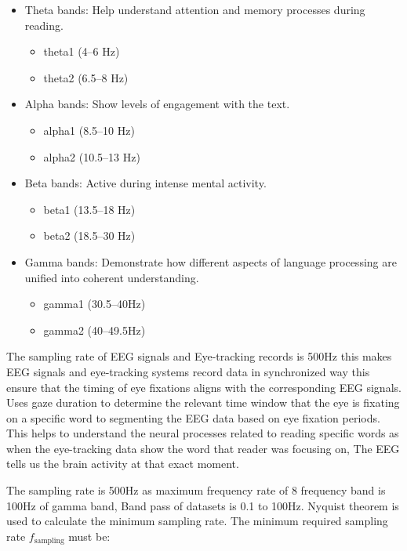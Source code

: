 \documentclass[journal]{IEEEtran}
\begin{document}
\begin{itemize}
	\item Theta bands: Help understand attention and memory processes during reading.
	      \begin{itemize}
	      	\item theta1 (4–6 Hz)
	      	\item theta2 (6.5–8 Hz)
	      \end{itemize}
	\item Alpha bands: Show levels of engagement with the text.
	      \begin{itemize}
	      	\item alpha1 (8.5–10 Hz)
	      	\item alpha2 (10.5–13 Hz)
	      \end{itemize}
	\item Beta bands: Active during intense mental activity.
	      \begin{itemize}
	      	\item beta1 (13.5–18 Hz) 
	      	\item beta2 (18.5–30 Hz)
	      \end{itemize}
	\item Gamma bands: Demonstrate how different aspects of language processing are unified into coherent understanding.
	      \begin{itemize}
	      	\item gamma1 (30.5–40Hz) 
	      	\item gamma2 (40–49.5Hz)
	      \end{itemize}
\end{itemize}


The sampling rate of EEG signals and Eye-tracking records is 500Hz this makes EEG signals and eye-tracking systems record data in synchronized way this ensure that the timing of eye fixations aligns with the corresponding EEG signals. Uses gaze duration to determine the relevant time window that the eye is fixating on a specific word to segmenting the EEG data based on eye fixation periods. This helps to understand the neural processes related to reading specific words as when the eye-tracking data show the word that reader was focusing on, The EEG tells us the brain activity at that exact moment. 

The sampling rate is 500Hz as maximum frequency rate of 8 frequency band is 100Hz of gamma band, Band pass of datasets is 0.1 to 100Hz. Nyquist theorem is used to calculate the minimum sampling rate. The minimum required sampling rate $f_{\text{sampling}}$ must be:
\end{document}
